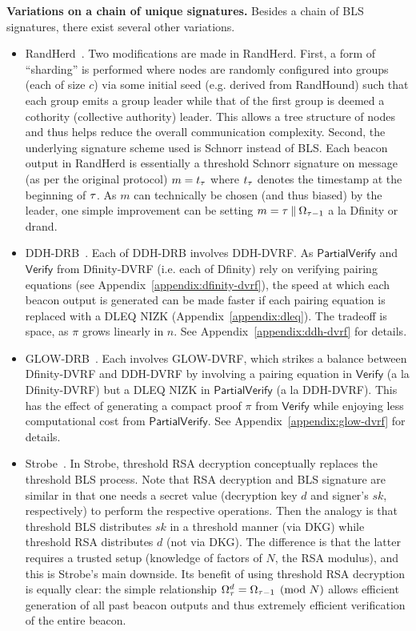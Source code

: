 \noindent\textbf{Variations on a chain of unique signatures.} Besides a chain of BLS signatures, there exist several other variations.
\begin{itemize}
\item RandHerd~\cite{syta2017scalable}. Two modifications are made in RandHerd. First, a form of ``sharding'' is performed where nodes are randomly configured into groups (each of size $c$) via some initial seed (e.g. derived from RandHound) such that each group emits a group leader while that of the first group is deemed a cothority (collective authority) leader. This allows a tree structure of nodes and thus helps reduce the overall communication complexity. Second, the underlying signature scheme used is Schnorr instead of BLS. Each beacon output in RandHerd is essentially a threshold Schnorr signature on message (as per the original protocol) $m = t_\tau$ where $t_\tau$ denotes the timestamp at the beginning of \epoch $\tau$. As $m$ can technically be chosen (and thus biased) by the leader, one simple improvement can be setting $m = \tau \mathbin\Vert \Omega_{\tau - 1}$ a la Dfinity or drand.
\item DDH-DRB~\cite{galindo2020fully}. Each \epoch of DDH-DRB involves DDH-DVRF. As $\mathsf{PartialVerify}$ and $\mathsf{Verify}$ from Dfinity-DVRF (i.e. each \epoch of Dfinity) rely on verifying pairing equations (see Appendix~\ref{appendix:dfinity-dvrf}), the speed at which each beacon output is generated can be made faster if each pairing equation is replaced with a DLEQ NIZK (Appendix~\ref{appendix:dleq}). The tradeoff is space, as $\pi$ grows linearly in $n$. See Appendix~\ref{appendix:ddh-dvrf} for details.
\item GLOW-DRB~\cite{galindo2020fully}. Each \epoch involves GLOW-DVRF, which strikes a balance between Dfinity-DVRF and DDH-DVRF by involving a pairing equation in $\mathsf{Verify}$ (a la Dfinity-DVRF) but a DLEQ NIZK in $\mathsf{PartialVerify}$ (a la DDH-DVRF). This has the effect of generating a compact proof $\pi$ from $\mathsf{Verify}$ while enjoying less computational cost from $\mathsf{PartialVerify}$. See Appendix~\ref{appendix:glow-dvrf} for details.
\item Strobe~\cite{beaver2021strobe}. In Strobe, threshold RSA decryption conceptually replaces the threshold BLS process. Note that RSA decryption and BLS signature are similar in that one needs a secret value (decryption key $d$ and signer's $sk$, respectively) to perform the respective operations. Then the analogy is that threshold BLS distributes $sk$ in a threshold manner (via DKG) while threshold RSA distributes $d$ (not via DKG). The difference is that the latter requires a trusted setup (knowledge of factors of $N$, the RSA modulus), and this is Strobe's main downside. Its benefit of using threshold RSA decryption is equally clear: the simple relationship $\Omega_\tau^d = \Omega_{\tau - 1} \pmod N$ allows efficient generation of all past beacon outputs and thus extremely efficient verification of the entire beacon.
\end{itemize}

